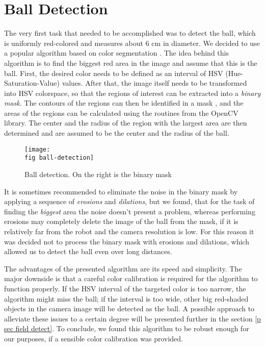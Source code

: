 \section{Ball Detection}
\label{p sec ball detection}

The very first task that needed to be accomplished was to detect the ball,
which is uniformly red-colored and measures about 6 cm in diameter. We decided
to use a popular algorithm based on color segmentation \cite{ball-detect}. The
idea behind this algorithm is to find the biggest red area in the image and
assume that this is the ball. First, the desired color needs to be defined as
an interval of HSV (Hue-Saturation-Value) \cite{hsv} values. After that, the
image itself needs to be transformed into HSV colorspace, so that the regions
of interest can be extracted into a \textit{binary mask}. The contours of the
regions can then be identified in a mask \cite{contours}, and the areas of the
regions can be calculated using the routines from the OpenCV library. The
center and the radius of the region with the largest area are then determined
and are assumed to be the center and the radius of the ball.

\begin{figure}[ht]
  \texttt{[image: \\fig ball-detection]}
  \caption[Ball detection]{Ball detection. On the right is the binary mask}
  \label{p figure ball-detection}
\end{figure}

It is sometimes recommended \cite{ball-detect} to eliminate the noise in the
binary mask by applying a sequence of \textit{erosions} and \textit{dilations},
but we found, that for the task of finding the \textit{biggest} area the noise
doesn't present a problem, whereas performing erosions may completely delete
the image of the ball from the mask, if it is relatively far from the robot and
the camera resolution is low. For this reason it was decided not to process the
binary mask with erosions and dilations, which allowed us to detect the ball
even over long distances.

The advantages of the presented algorithm are its speed and simplicity. The
major downside is that a careful color calibration is required for the
algorithm to function properly. If the HSV interval of the targeted color is
too narrow, the algorithm might miss the ball; if the interval is too
wide, other big red-shaded objects in the camera image will be detected as
the ball. A possible approach to alleviate these issues to a certain degree
will be presented further in the section \ref{p sec field detect}. To
conclude, we found this algorithm to be robust enough for our purposes, if a
sensible color calibration was provided.

